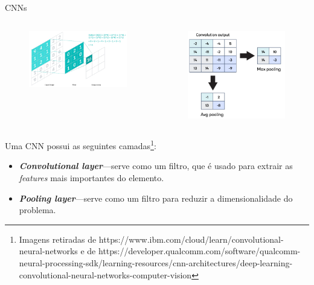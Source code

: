 \begin{frame}{CNNs \cont}

    \begin{columns}[T,onlytextwidth]

    \begin{figure}
        \centering
        \includegraphics[width=\textwidth]{img/convolution.png}
    \end{figure}


    \begin{figure}
        \centering
        \includegraphics[width=.65\textwidth]{img/pooling.png}
    \end{figure}

    \end{columns}

Uma CNN possui as seguintes camadas\footnote{\tiny{Imagens retiradas de https://www.ibm.com/cloud/learn/convolutional-neural-networks e de https://developer.qualcomm.com/software/qualcomm-neural-processing-sdk/learning-resources/cnn-architectures/deep-learning-convolutional-neural-networks-computer-vision}}:
\begin{itemize}
    \item \textit{\textbf{Convolutional layer}}---serve como um filtro, que é usado para extrair as \textit{features} mais importantes do elemento.
    \pause
    \item \textit{\textbf{Pooling layer}}---serve como um filtro para reduzir a dimensionalidade do problema.
\end{itemize}


\end{frame}
